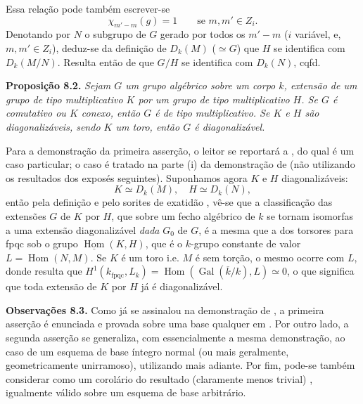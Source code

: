 Essa relação pode também escrever-se
\[
 \chi_{m'-m}(g)=1\qquad\text{se }m,m'\in Z_i.
\]
Denotando por \(N\) o subgrupo de \(G\) gerado por
todos os \(m'-m\) (\(i\) variável, e, \(m,m'\in Z_i\)),
deduz-se da definição de \(D_k(M)\) (\(\simeq G\))
que \(H\) se identifica com \(D_k(M/N)\). Resulta então
de  que
\(G/H\) se identifica com \(D_k(N)\), cqfd.

\medskip
\noindent{}\textbf{Proposição 8.2.}
%
\textit{Sejam \(G\) um grupo algébrico sobre um corpo
\(k\), extensão de um grupo de tipo multiplicativo
\(K\) por um grupo de tipo multiplicativo \(H\).
%
Se \(G\) é comutativo ou \(K\) conexo, então \(G\) é
de tipo multiplicativo.
%
Se \(K\) e \(H\) são diagonalizáveis, sendo \(K\) um
toro, então \(G\) é diagonalizável.}

Para a demonstração da primeira asserção, o leitor
se reportará a
,
do qual  é
um caso particular; o caso
 é tratado
na parte (i) da demonstração de
(não utilizando os resultados dos exposés seguintes).
Suponhamos agora \(K\) e \(H\) diagonalizáveis:
\[
 K\simeq D_k(M),\quad H\simeq D_k(N),
\]
então pela definição
 e pelo sorites
de exatidão ,
vê-se que a classificação das extensões \(G\) de \(K\)
por \(H\), que sobre um fecho algébrico de \(k\) se
tornam isomorfas a uma extensão diagonalizável
\emph{dada} \(G_0\) de \(G\), é a mesma que a dos
torsores para fpqc sob o grupo
\(\underline{\operatorname{Hom}}(K,H)\), que é o
\(k\)-grupo constante de valor \(L=\operatorname{Hom}(N,M)\).
Se \(K\) é um toro i.e. \(M\) é sem torção, o mesmo
ocorre com \(L\), donde resulta
%
%
%
%
que \(H^1(k_{\mathrm{fpqc}},L_k)
=\operatorname{Hom}(\operatorname{Gal}(\overline k/k),L)
\simeq0\), o que significa que toda extensão de \(K\)
por \(H\) já é diagonalizável.

\medskip
\noindent{}\textbf{Observações 8.3.}
Como já se assinalou na demonstração de
, a primeira
asserção é enunciada e provada sobre uma base qualquer
em .
Por outro lado, a segunda asserção se generaliza, com
essencialmente a mesma demonstração, ao caso de um
esquema de base íntegro normal (ou mais geralmente,
geometricamente unirramoso), utilizando
 mais adiante.
Por fim, pode-se também considerar
 como um
corolário do resultado (claramente menos trivial)
, igualmente
válido sobre um esquema de base arbitrário.

%
%
